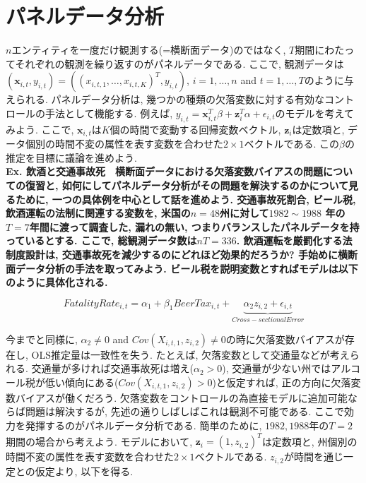 \documentclass[paper=a4paper,fontsize=10pt]{jlreq}
\begin{document}
\section{パネルデータ分析}
$n$エンティティを一度だけ観測する(=横断面データ)のではなく, $T$期間にわたってそれぞれの観測を繰り返すのがパネルデータである. ここで, 観測データは$(\mathbf{x}_{i,t}, y_{i,t}) = ((x_{i,t,1}, \dots, x_{i,t,K})^T, y_{i,t})$, $i=1,\dots,n$ and $t=1,\dots,T$のように与えられる. パネルデータ分析は, 幾つかの種類の欠落変数に対する有効なコントロールの手法として機能する. 例えば, $y_{i,t} = \mathbf{x}_{i,t}^T \beta + \mathbf{z}_{i}^T \alpha + \epsilon_{i,t}$のモデルを考えてみよう. ここで, $\mathbf{x}_{i,t}$は$K$個の時間で変動する回帰変数ベクトル, $\mathbf{z}_{i}$は定数項と, データ個別の時間不変の属性を表す変数を合わせた$2\times1$ベクトルである. この$\beta$の推定を目標に議論を進めよう.\\

\rmfamily\mcfamily\bfseries{Ex. 飲酒と交通事故死}\mdseries　横断面データにおける欠落変数バイアスの問題についての復習と, 如何にしてパネルデータ分析がその問題を解決するのかについて見るために, 一つの具体例を中心として話を進めよう. 交通事故死割合, ビール税, 飲酒運転の法制に関連する変数を, 米国の$n = 48$州に対して$1982 \sim 1988$ 年の$T = 7$年間に渡って調査した, 漏れの無い, つまり\rmfamily\mcfamily\bfseries{バランスした}\mdseries パネルデータを持っているとする. ここで, 総観測データ数は$nT = 336$. 飲酒運転を厳罰化する法制度設計は, 交通事故死を減少するのにどれほど効果的だろうか? 手始めに横断面データ分析の手法を取ってみよう. ビール税を説明変数とすればモデルは以下のように具体化される.

\begin{equation*}
  FatalityRate_{i,t} = \alpha_1 + \beta_1 BeerTax_{i,t} + \underset{Cross-sectional Error}{\underbrace{\alpha_2z_{i,2} + \epsilon_{i,t}}}
\end{equation*}

今までと同様に, $\alpha_2 \neq 0$ and $Cov(X_{i,t,1}, z_{i,2}) \neq 0$の時に欠落変数バイアスが存在し, OLS推定量は一致性を失う. たとえば, 欠落変数として交通量などが考えられる. 交通量が多ければ交通事故死は増え($\alpha_2 > 0$), 交通量が少ない州ではアルコール税が低い傾向にある($Cov(X_{i,t,1}, z_{i,2}) > 0$)と仮定すれば, 正の方向に欠落変数バイアスが働くだろう. 欠落変数をコントロールの為直接モデルに追加可能ならば問題は解決するが, 先述の通りしばしばこれは観測不可能である. ここで効力を発揮するのがパネルデータ分析である. 簡単のために, $1982, 1988$年の$T = 2$期間の場合から考えよう. モデルにおいて, $\mathbf{z}_{i} = (1, z_{i,2})^T$は定数項と, 州個別の時間不変の属性を表す変数を合わせた$2\times1$ベクトルである. $z_{i,2}$が時間を通じ一定との仮定より, 以下を得る.
\end{document}
